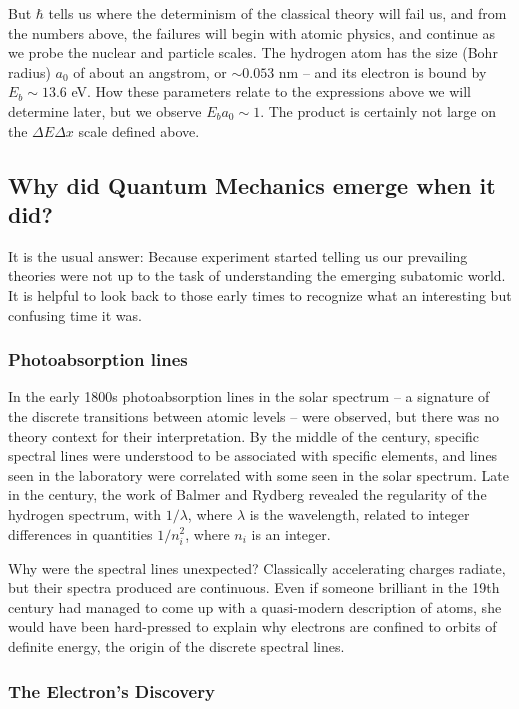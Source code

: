 But $\hbar$ tells us where the determinism of the classical theory will fail
us, and from the numbers above, the failures will begin with atomic physics,
and continue as we probe the nuclear and particle scales. The hydrogen atom has
the size (Bohr radius) $a_0$ of about an angstrom, or $\sim 0.053$ nm -- and
its electron is bound by $E_b \sim 13.6$ eV. How these parameters relate to the
expressions above we will determine later, but we observe $E_b a_0 \sim 1$. The
product is certainly not large on the $\Delta E \Delta x$ scale defined above.

\subsection{Why did Quantum Mechanics emerge when it did?}

It is the usual answer: 
Because experiment started telling us our prevailing theories were not up to
the task of understanding the emerging subatomic world. It is helpful to look 
back to those early times to recognize what an interesting but confusing time
it was. 

\subsubsection{Photoabsorption lines}

In the early 1800s photoabsorption lines in the solar spectrum -- a signature
of the discrete transitions between atomic levels -- were observed, but there
was no theory context for their interpretation. By the middle of the century,
specific spectral lines were understood to be associated with specific
elements, and lines seen in the laboratory were correlated with some seen in
the solar spectrum. Late in the century, the work of Balmer and Rydberg
revealed the regularity of the hydrogen spectrum, with $1/\lambda$, where
$\lambda$ is the wavelength, related to integer differences in quantities
$1/n_i^2$, where $n_i$ is an integer.

Why were the spectral lines unexpected? Classically accelerating charges
radiate, but their spectra produced are continuous. Even if someone brilliant
in the 19th century had managed to come up with a quasi-modern description of
atoms, she would have been hard-pressed to explain why electrons are confined
to orbits of definite energy, the origin of the discrete spectral lines. 

\subsubsection{The Electron's Discovery} 

